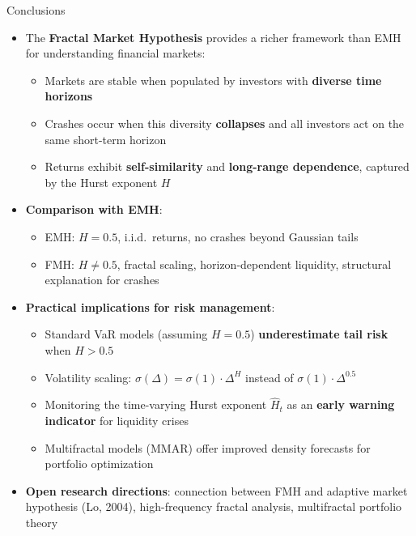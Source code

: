 \documentclass[9pt, aspectratio=169, t]{beamer}
\theoremstyle{definition}
\begin{document}
\begin{frame}{Conclusions}
    \begin{itemize}
        \item The \textbf{Fractal Market Hypothesis} provides a richer framework than EMH for understanding financial markets:
        \begin{itemize}
            \item Markets are stable when populated by investors with \textbf{diverse time horizons}
            \item Crashes occur when this diversity \textbf{collapses} and all investors act on the same short-term horizon
            \item Returns exhibit \textbf{self-similarity} and \textbf{long-range dependence}, captured by the Hurst exponent $H$
        \end{itemize}
        \item \textbf{Comparison with EMH}:
        \begin{itemize}
            \item EMH: $H = 0.5$, i.i.d.\ returns, no crashes beyond Gaussian tails
            \item FMH: $H \neq 0.5$, fractal scaling, horizon-dependent liquidity, structural explanation for crashes
        \end{itemize}
        \item \textbf{Practical implications for risk management}:
        \begin{itemize}
            \item Standard VaR models (assuming $H = 0.5$) \textbf{underestimate tail risk} when $H > 0.5$
            \item Volatility scaling: $\sigma(\Delta) = \sigma(1) \cdot \Delta^H$ instead of $\sigma(1) \cdot \Delta^{0.5}$
            \item Monitoring the time-varying Hurst exponent $\hat{H}_t$ as an \textbf{early warning indicator} for liquidity crises
            \item Multifractal models (MMAR) offer improved density forecasts for portfolio optimization
        \end{itemize}
        \item \textbf{Open research directions}: connection between FMH and adaptive market hypothesis (Lo, 2004), high-frequency fractal analysis, multifractal portfolio theory
    \end{itemize}
\end{frame}
\end{document}
